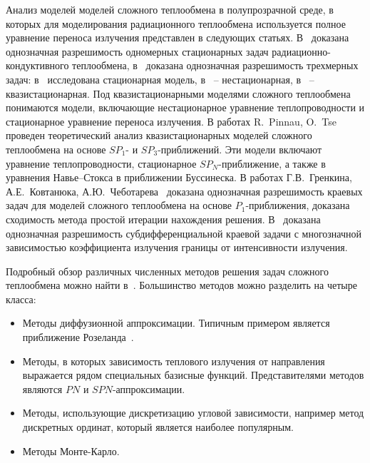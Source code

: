     Анализ моделей моделей сложного теплообмена в полупрозрачной среде, в
    которых для моделирования радиационного теплообмена используется
    полное уравнение переноса излучения представлен в следующих статьях.
    В~\cite{asllanaj2003existence, kelley1996existence} доказана
    однозначная разрешимость одномерных стационарных
    задач радиационно-кондуктивного теплообмена,
    в~\cite{ghattassi2018existence, Porzio2004, Thompson2004} доказана
    однозначная разрешимость трехмерных задач: в~\cite{Thompson2004} исследована
    стационарная модель, в~\cite{Porzio2004} -- нестационарная,
    в~\cite{ghattassi2018existence} -- квазистационарная.
    Под квазистационарными моделями сложного теплообмена понимаются
    модели, включающие нестационарное уравнение теплопроводности и
    стационарное уравнение переноса излучения.
    В работах R.\ Pinnau, O.\ Tse~\cite{Pinnau2007, Pinnau2013}
    проведен теоретический анализ квазистационарных моделей сложного
    теплообмена на основе $SP_1$- и $SP_3$-приближений.
    Эти модели включают уравнение теплопроводности, стационарное $SP_N$-приближение, а также
    в~\cite{Pinnau2013} уравнения Навье–Стокса в приближении Буссинеска.
    В работах Г.В.\ Гренкина, А.Е.\ Ковтанюка,
    А.Ю.\ Чеботарева~\cite{Kovtanyuk2014, Kovtanyuk2016, Chebotarev22, Pak23}
    доказана однозначная разрешимость краевых задач для моделей
    сложного теплообмена на основе $P_1$-приближения, доказана сходимость
    метода простой итерации нахождения решения.
    В~\cite{Chebotarev2016Odnaznachnaya} доказана однозначная
    разрешимость субдифференциальной краевой задачи с многозначной
    зависимостью коэффициента излучения границы от интенсивности
    излучения.

    Подробный обзор различных численных методов решения задач сложного
    теплообмена можно найти в~\cite{modest2013radiative}.
    Большинство методов можно разделить на четыре класса:
    \begin{itemize}
        \item Методы диффузионной аппроксимации.
        Типичным примером является приближение Розеланда~\cite{farina2011mathematical, Siedow2011}.
        \item Методы, в которых зависимость теплового излучения от направления
        выражается рядом специальных базисные функций.
        Представителями методов являются $PN$ и $SPN$-аппроксимации.
        \item Методы, использующие дискретизацию угловой зависимости, например
        метод дискретных ординат, который является наиболее популярным.
        \item Методы Монте-Карло.
    \end{itemize}


